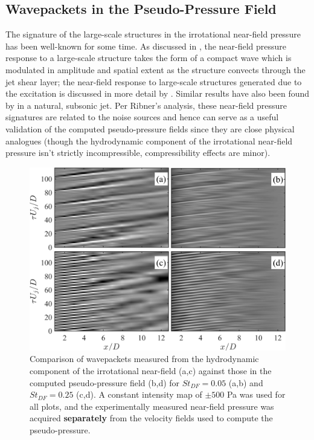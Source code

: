 \subsection{Wavepackets in the Pseudo-Pressure Field}
The signature of the large-scale structures in the irrotational near-field pressure has been well-known for some time.
As discussed in , the near-field pressure response to a large-scale structure takes the form of a compact wave which is modulated in amplitude and spatial extent as the structure convects through the jet shear layer; the near-field response to large-scale structures generated due to the excitation is discussed in more detail by \citet{Sinha2012}.
Similar results have also been found by \citet{Tinney2008} in a natural, subsonic jet.
Per Ribner's analysis, these near-field pressure signatures are related to the noise sources and hence can serve as a useful validation of the computed pseudo-pressure fields since they are close physical analogues (though the hydrodynamic component of the irrotational near-field pressure isn't strictly incompressible, compressibility effects are minor). 
\begin{figure}
	\centering
	\includegraphics[width=0.9\linewidth]{Figures/sect_aeroacoustic_wvpkt_validation.png}
	\caption{Comparison of wavepackets measured from the hydrodynamic component of the irrotational near-field (a,c) against those in the computed pseudo-pressure field (b,d) for $St_{DF} = 0.05$ (a,b) and $St_{DF} = 0.25$ (c,d). A constant intensity map of $\pm 500$ Pa was used for all plots, and the experimentally measured near-field pressure was acquired \textbf{separately} from the velocity fields used to compute the pseudo-pressure.}
	\label{fig:flowfield_wvpkts}
\end{figure}

